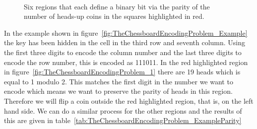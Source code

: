 \begin{figure}[H]
	\begin{center}
		\begin{tikzpicture}[scale=0.6]
			
		\end{tikzpicture}\hspace{5mm}
		\begin{tikzpicture}[scale=0.6]
			
		\end{tikzpicture}\hspace{5mm}
		\begin{tikzpicture}[scale=0.6]
			
		\end{tikzpicture}\vspace{6mm}
		\\
		\begin{tikzpicture}[scale=0.6]
			
		\end{tikzpicture}\hspace{5mm}
		\begin{tikzpicture}[scale=0.6]
			
		\end{tikzpicture}\hspace{5mm}
		\begin{tikzpicture}[scale=0.6]
			
		\end{tikzpicture}
	\end{center}
	\caption{Six regions that each define a binary bit via the parity of the number of heads-up coins in the squares highlighted in red.}
	\label{fig:TheChessboardEncodingProblem_Grids}
\end{figure}

In the example shown in figure~\ref{fig:TheChessboardEncodingProblem_Example} the key has been hidden in the cell in the third row and seventh column. Using the first three digits to encode the column number and the last three digits to encode the row number, this is encoded as 111011. In the red highlighted region in figure~\ref{fig:TheChessboardEncodingProblem_1} there are 19 heads which is equal to 1 modulo 2. This matches the first digit in the number we want to encode which means we want to preserve the parity of heads in this region. Therefore we will flip a coin outside the red highlighted region, that is, on the left hand side. We can do a similar process for the other regions and the results of this are given in table~\ref{tab:TheChessboardEncodingProblem_ExampleParity}

